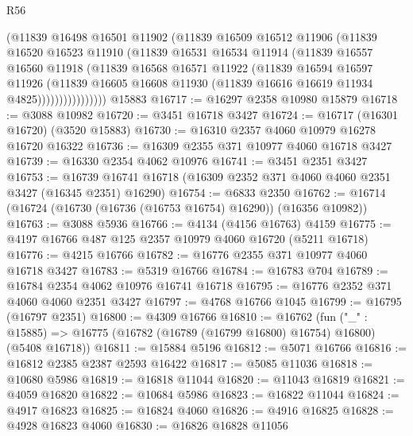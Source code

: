 \begin{lexlean}{R56}
\begin{coremodule}
                  (@11839
                    @16498
                    @16501
                    @11902
                    (@11839
                      @16509
                      @16512
                      @11906
                      (@11839
                        @16520
                        @16523
                        @11910
                        (@11839
                          @16531
                          @16534
                          @11914
                          (@11839
                            @16557
                            @16560
                            @11918
                            (@11839
                              @16568
                              @16571
                              @11922
                              (@11839
                                @16594
                                @16597
                                @11926
                                (@11839
                                  @16605
                                  @16608
                                  @11930
                                  (@11839 @16616 @16619 @11934 @4825))))))))))))))))
    @15883
@16717 := @16297 @2358 @10980 @15879
@16718 := @3088 @10982
@16720 := @3451 @16718 @3427
@16724 := @16717 (@16301 @16720) (@3520 @15883)
@16730 := @16310 @2357 @4060 @10979 @16278 @16720 @16322
@16736 := @16309 @2355 @371 @10977 @4060 @16718 @3427
@16739 := @16330 @2354 @4062 @10976
@16741 := @3451 @2351 @3427
@16753 := @16739 @16741 @16718 (@16309 @2352 @371 @4060 @4060 @2351 @3427 (@16345 @2351) @16290)
@16754 := @6833 @2350
@16762 := @16714 (@16724 (@16730 (@16736 (@16753 @16754) @16290)) (@16356 @10982))
@16763 := @3088 @5936
@16766 := @4134 (@4156 @16763) @4159
@16775 := @4197 @16766 @487 @125 @2357 @10979 @4060 @16720 (@5211 @16718)
@16776 := @4215 @16766
@16782 := @16776 @2355 @371 @10977 @4060 @16718 @3427
@16783 := @5319 @16766
@16784 := @16783 @704
@16789 := @16784 @2354 @4062 @10976 @16741 @16718
@16795 := @16776 @2352 @371 @4060 @4060 @2351 @3427
@16797 := @4768 @16766 @1045
@16799 := @16795 (@16797 @2351)
@16800 := @4309 @16766
@16810 := @16762
    (fun ("_" : @15885) => @16775 (@16782 (@16789 (@16799 @16800) @16754) @16800) (@5408 @16718))
@16811 := @15884 @5196
@16812 := @5071 @16766
@16816 := @16812 @2385 @2387 @2593 @16422
@16817 := @5085 @11036
@16818 := @10680 @5986
@16819 := @16818 @11044
@16820 := @11043 @16819
@16821 := @4059 @16820
@16822 := @10684 @5986
@16823 := @16822 @11044
@16824 := @4917 @16823
@16825 := @16824 @4060
@16826 := @4916 @16825
@16828 := @4928 @16823 @4060
@16830 := @16826 @16828 @11056

\end{coremodule}
\end{lexlean}
